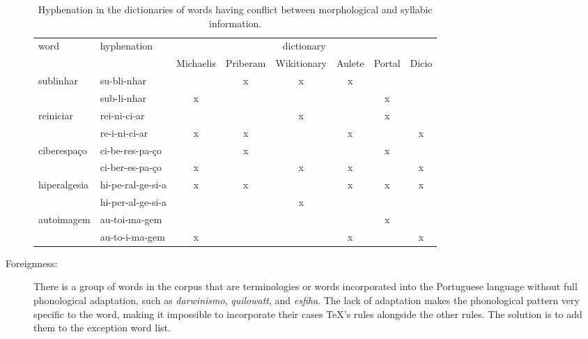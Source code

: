 \begin{description}
	\begin{table}
	\centering
	\scriptsize
	\caption{Hyphenation in the dictionaries of words having conflict between morphological and syllabic information.}
	\label{tab-mor-syl}
        \begin{tabular}{ll*{6}{c}}
	\toprule
	    word                      & hyphenation       & \multicolumn{6}{c}{dictionary} \\
             &                                            & Michaelis & Priberam & Wikitionary & Aulete & Portal & Dicio \\
	\midrule
        \multirow{2}{*}{sublinhar}    & su-bli-nhar       &           & x        & x           & x      &        &       \\
				      & sub-li-nhar       & x         &          &             &        & x      &       \\
	\midrule
	\multirow{2}{*}{reiniciar}    & rei-ni-ci-ar      &           &          & x           &        & x      &       \\
				      & re-i-ni-ci-ar     & x         & x        &             & x      &        & x     \\
	\midrule
	\multirow{2}{*}{ciberespaço}  & ci-be-res-pa-ço   &           & x        &             &        & x      &       \\
				      & ci-ber-es-pa-ço   & x         &          & x           & x      &        & x     \\
	\midrule
	\multirow{2}{*}{hiperalgesia} & hi-pe-ral-ge-si-a & x         & x        &             & x      & x      & x     \\
				      & hi-per-al-ge-si-a &           &          & x           &        &        &       \\
	\midrule
	\multirow{2}{*}{autoimagem}   & au-toi-ma-gem     &           &          &             &        & x      &       \\
				      & au-to-i-ma-gem    & x         &          &             & x      &        & x     \\
	\bottomrule
	\end{tabular}
	\end{table}

    \item[Foreignness:\label{foreignness}] There is a group of words %
	in the corpus that are terminologies or words incorporated into the 
	Portuguese language without full phonological adaptation, such as 
	\emph{darwinismo}, \emph{quilowatt}, and \emph{esfiha}. The lack of
	adaptation makes the phonological pattern very specific to the word,
	making it impossible to incorporate their cases \TeX{}'s rules alongside the
	other rules. The solution is to add them to the exception word list.


\end{description}
